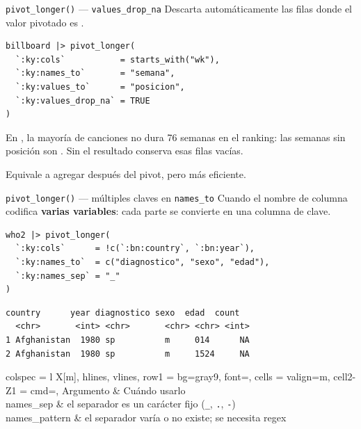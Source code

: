 \documentclass[8pt]{beamer}
\begin{document}
	\begin{frame}[fragile]{\texttt{pivot\_longer()} — \texttt{values\_drop\_na}}
		Descarta automáticamente las filas donde el valor pivotado es .

		\begin{lstlisting}[style=RScript]
billboard |> pivot_longer(
  `:ky:cols`           = starts_with("wk"),
  `:ky:names_to`       = "semana",
  `:ky:values_to`      = "posicion",
  `:ky:values_drop_na` = TRUE
)
\end{lstlisting}

		\begin{block}{}
			En , la mayoría de canciones no dura 76 semanas en el ranking: las semanas sin posición son . Sin  el resultado conserva esas filas vacías.
		\end{block}

		\begin{exampleblock}{}
			Equivale a agregar  después del pivot, pero más eficiente.
		\end{exampleblock}
	\end{frame}

	\begin{frame}[fragile]{\texttt{pivot\_longer()} — múltiples claves en \texttt{names\_to}}
		Cuando el nombre de columna codifica \textbf{varias variables}: cada parte se convierte en una columna de clave.

		\begin{lstlisting}[style=RScript]
who2 |> pivot_longer(
  `:ky:cols`      = !c(`:bn:country`, `:bn:year`),
  `:ky:names_to`  = c("diagnostico", "sexo", "edad"),
  `:ky:names_sep` = "_"
)
\end{lstlisting}
		\begin{lstlisting}[style=RConsole]
  country      year diagnostico sexo  edad  count
  <chr>       <int> <chr>       <chr> <chr> <int>
1 Afghanistan  1980 sp          m     014      NA
2 Afghanistan  1980 sp          m     1524     NA
\end{lstlisting}

		\begin{tblr}{
			colspec = {l X[m]},
			hlines, vlines,
			row{1} = {bg=gray9, font=\bfseries},
			cells = {valign=m},
			cell{2-Z}{1} = {cmd=\rscript},
		}
			Argumento & Cuándo usarlo \\
			names_sep & el separador es un carácter fijo (\texttt{\_}, \texttt{.}, \texttt{-}) \\
			names_pattern & el separador varía o no existe; se necesita regex \\
		\end{tblr}
	\end{frame}
\end{document}
